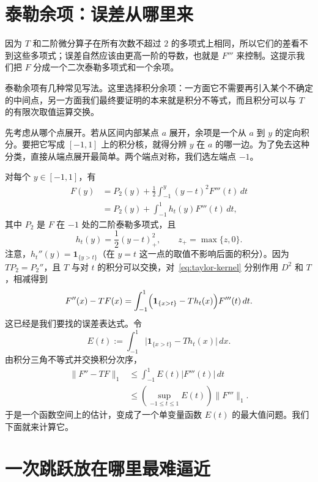 \documentclass[UTF8,fontset=windows,a4paper,11pt]{ctexart}
\newcommand{\Lone}[1]{\lVert #1\rVert_1}
\begin{document}
\section{泰勒余项：误差从哪里来}
\label{sec:taylor}

因为 $T$ 和二阶微分算子在所有次数不超过 $2$ 的多项式上相同，所以它们的差看不到这些多项式；误差自然应该由更高一阶的导数，也就是 $F'''$ 来控制。这提示我们把 $F$ 分成一个二次泰勒多项式和一个余项。

泰勒余项有几种常见写法。这里选择积分余项：一方面它不需要再引入某个不确定的中间点，另一方面我们最终要证明的本来就是积分不等式，而且积分可以与 $T$ 的有限次取值运算交换。

先考虑从哪个点展开。若从区间内部某点 $a$ 展开，余项是一个从 $a$ 到 $y$ 的定向积分。要把它写成 $[-1,1]$ 上的积分核，就得分辨 $y$ 在 $a$ 的哪一边。为了免去这种分类，直接从端点展开最简单。两个端点对称，我们选左端点 $-1$。

对每个 $y\in[-1,1]$，有
\begin{align}
    F(y)&=P_2(y)+\frac12\int_{-1}^{y}(y-t)^2F'''(t)\,dt\\
    &=P_2(y)+\int_{-1}^{1}h_t(y)F'''(t)\,dt,
    \label{eq:taylor-kernel}
\end{align}
其中 $P_2$ 是 $F$ 在 $-1$ 处的二阶泰勒多项式，且
\begin{equation}
    h_t(y)=\frac12(y-t)_+^2,\qquad z_+=\max\{z,0\}.
    \label{eq:hinge}
\end{equation}
注意，$h_t''(y)=\mathbf1_{\{y>t\}}$（在 $y=t$ 这一点的取值不影响后面的积分）。因为 $TP_2=P_2''$，且 $T$ 与对 $t$ 的积分可以交换，对~\eqref{eq:taylor-kernel} 分别作用 $D^2$ 和 $T$，相减得到
\begin{equation}
    F''(x)-TF(x)
    =\int_{-1}^{1}\Bigl(\mathbf1_{\{x>t\}}-Th_t(x)\Bigr)F'''(t)\,dt.
    \label{eq:Peano}
\end{equation}
这已经是我们要找的误差表达式。令
\begin{equation}
    E(t):=\int_{-1}^{1}\bigl|\mathbf1_{\{x>t\}}-Th_t(x)\bigr|\,dx.
    \label{eq:E-definition}
\end{equation}
由积分三角不等式并交换积分次序，
\begin{align}
    \Lone{F''-TF}
    &\le\int_{-1}^{1}E(t)|F'''(t)|\,dt\\
    &\le\left(\sup_{-1\le t\le1}E(t)\right)\Lone{F'''}.
    \label{eq:error-via-E}
\end{align}
于是一个函数空间上的估计，变成了一个单变量函数 $E(t)$ 的最大值问题。我们下面就来计算它。

\section{一次跳跃放在哪里最难逼近}
\label{sec:estimate}
\end{document}
